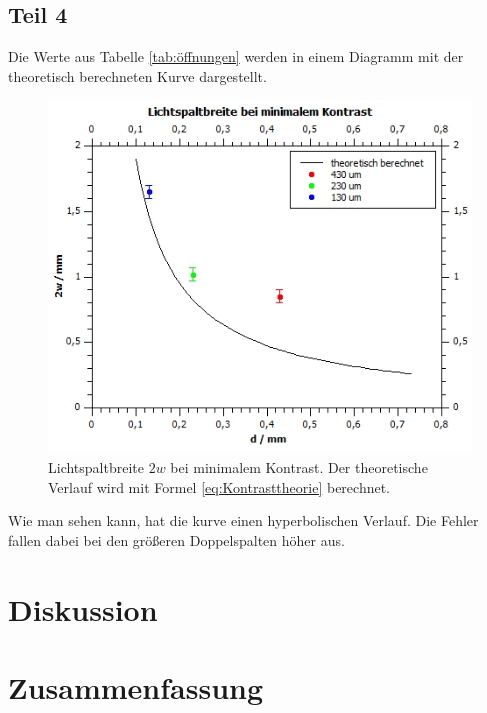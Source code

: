 \documentclass[12pt,a4paper,twoside]{article}
\begin{document}
\subsection{Teil 4}
Die Werte aus Tabelle \ref{tab:öffnungen} werden in einem Diagramm mit der theoretisch berechneten Kurve dargestellt. 

\begin{figure}[H]
    \centering
    \includegraphics[width=0.6\linewidth]{nudes/aufgabe 4 plot.jpg}
    \caption{Lichtspaltbreite $2w$ bei minimalem Kontrast. Der theoretische Verlauf wird mit Formel \ref{eq:Kontrasttheorie} berechnet. }
    \label{fig:aufgabe 4 kontrast}
\end{figure}

\noindent
Wie man sehen kann, hat die kurve einen hyperbolischen Verlauf. Die Fehler fallen dabei bei den größeren Doppelspalten höher aus. 


\section{Diskussion} %


\section{Zusammenfassung} %

 
\printbibliography[heading=bibintoc]
\end{document}
